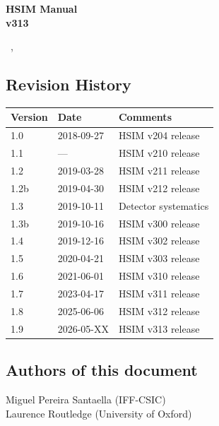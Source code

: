 \documentclass[12pt]{report}
\def\mydate{\leavevmode\hbox{\the\day~\monthname, \the\year}}
\begin{document}
\begin{titlepage}

\vspace*{4cm}
\begin{center}

{\selectfont
\Huge
\textbf{
HSIM Manual\\[0.5ex]
\Large
v313}
\vspace{2cm}

\large
\mydate
}
\end{center}
\vspace*{\fill}


\end{titlepage}

\tableofcontents

\vfill
\subsection*{Revision History}

\begin{table}[h]
\label{tab:revision}
\begin{tabular}{lll}
\hline
Version & Date & Comments \\
\hline
1.0 & 2018-09-27 & HSIM v204 release \\
1.1 & --- & HSIM v210 release \\
1.2 & 2019-03-28 & HSIM v211 release \\
1.2b & 2019-04-30 & HSIM v212 release \\
1.3 & 2019-10-11 & Detector systematics \\
1.3b & 2019-10-16 & HSIM v300 release \\
1.4 & 2019-12-16 & HSIM v302 release \\
1.5 & 2020-04-21 & HSIM v303 release \\
1.6 & 2021-06-01 & HSIM v310 release \\
1.7 & 2023-04-17 & HSIM v311 release \\
1.8 & 2025-06-06 & HSIM v312 release \\
1.9 & 2026-05-XX & HSIM v313 release \\
\hline
\end{tabular}
\end{table}


\subsection*{Authors of this document}
Miguel Pereira Santaella (IFF-CSIC) \\
Laurence Routledge (University of Oxford)
\end{document}
